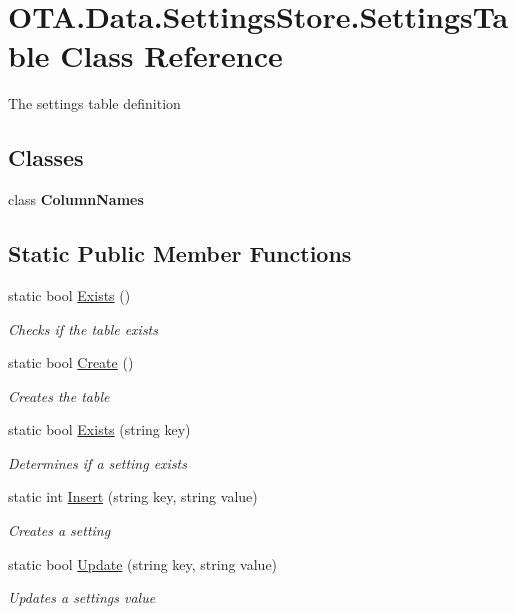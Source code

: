 \hypertarget{class_o_t_a_1_1_data_1_1_settings_store_1_1_settings_table}{}\section{O\+T\+A.\+Data.\+Settings\+Store.\+Settings\+Table Class Reference}
\label{class_o_t_a_1_1_data_1_1_settings_store_1_1_settings_table}


The settings table definition  


\subsection*{Classes}
\begin{DoxyCompactItemize}
\item 
class {\bfseries Column\+Names}
\end{DoxyCompactItemize}
\subsection*{Static Public Member Functions}
\begin{DoxyCompactItemize}
\item 
static bool \hyperlink{class_o_t_a_1_1_data_1_1_settings_store_1_1_settings_table_a340b5433b912651fafd3c501ae5d95bb}{Exists} ()
\begin{DoxyCompactList}\small\item\em Checks if the table exists \end{DoxyCompactList}\item 
static bool \hyperlink{class_o_t_a_1_1_data_1_1_settings_store_1_1_settings_table_a1bf18a50ea6fde4da77f9d7b422a2958}{Create} ()
\begin{DoxyCompactList}\small\item\em Creates the table \end{DoxyCompactList}\item 
static bool \hyperlink{class_o_t_a_1_1_data_1_1_settings_store_1_1_settings_table_a54c659ac7f411d71b7a10c77ba3850f4}{Exists} (string key)
\begin{DoxyCompactList}\small\item\em Determines if a setting exists \end{DoxyCompactList}\item 
static int \hyperlink{class_o_t_a_1_1_data_1_1_settings_store_1_1_settings_table_a6242861168496200c70abae82d364aef}{Insert} (string key, string value)
\begin{DoxyCompactList}\small\item\em Creates a setting \end{DoxyCompactList}\item 
static bool \hyperlink{class_o_t_a_1_1_data_1_1_settings_store_1_1_settings_table_a14f978d08d4d7498856c1aa86dfb0625}{Update} (string key, string value)
\begin{DoxyCompactList}\small\item\em Updates a settings value \end{DoxyCompactList}\end{DoxyCompactItemize}
